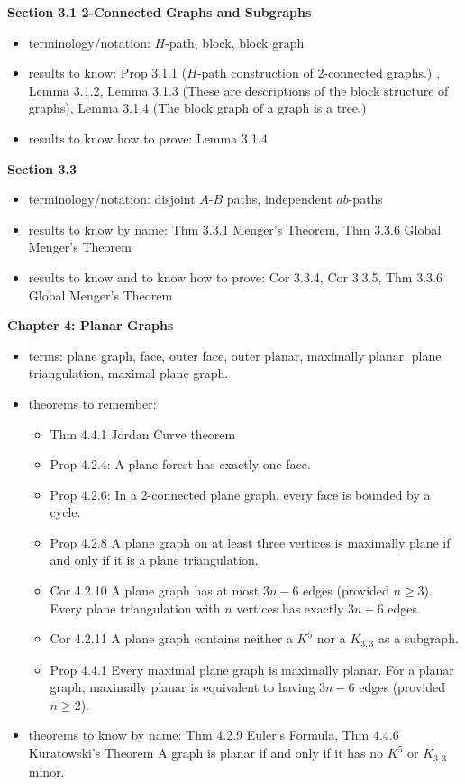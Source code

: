 \documentclass[12pt]{article}
\begin{document}
\noindent \textbf{Section 3.1 2-Connected Graphs and Subgraphs}
	\begin{itemize}
	\item terminology/notation: $H$-path, block, block graph
	\item results to know: Prop 3.1.1 ($H$-path construction of 2-connected graphs.) , Lemma 3.1.2, Lemma 3.1.3 (These are descriptions of the block structure of graphs), Lemma 3.1.4 (The block graph of a graph is a tree.)
	\item results to know how to prove: Lemma 3.1.4
	\end{itemize}
\noindent \textbf{Section 3.3}
	\begin{itemize}
	\item terminology/notation: disjoint $A$-$B$ paths, independent $ab$-paths
	\item results to know by name: Thm 3.3.1 Menger's Theorem, Thm 3.3.6 Global Menger's Theorem
	\item results to know and to know how to prove: Cor 3.3.4, Cor 3.3.5, Thm 3.3.6 Global Menger's Theorem
	\end{itemize}


\noindent \textbf{Chapter 4: Planar Graphs}
\begin{itemize}
	\item terms: plane graph, face, outer face, outer planar, maximally planar, plane triangulation, maximal plane graph.
	\item theorems to remember: 
	\begin{itemize}
		\item Thm 4.4.1 Jordan Curve theorem
		\item Prop 4.2.4: A plane forest has exactly one face.
		\item Prop 4.2.6: In a 2-connected plane graph, every face is bounded by a cycle.
		\item Prop 4.2.8 A plane graph on at least three vertices is maximally plane if and only if it is a plane triangulation. 
		\item Cor 4.2.10 A plane graph has at most $3n-6$ edges (provided $n \geq 3$). Every plane triangulation with $n$ vertices has exactly $3n-6$ edges.
		\item Cor 4.2.11 A plane graph contains neither a $K^5$ nor a $K_{3,3}$ as a subgraph.
		\item Prop 4.4.1 Every maximal plane graph is maximally planar. For a planar graph, maximally planar is equivalent to having $3n-6$ edges (provided $n \geq 2$).
	\end{itemize}  
	\item theorems to know by name: Thm 4.2.9 Euler's Formula, Thm 4.4.6 Kuratowski's Theorem A graph is planar if and only if it has no $K^5$ or $K_{3,3}$ minor.
\end{itemize}
\end{document}
